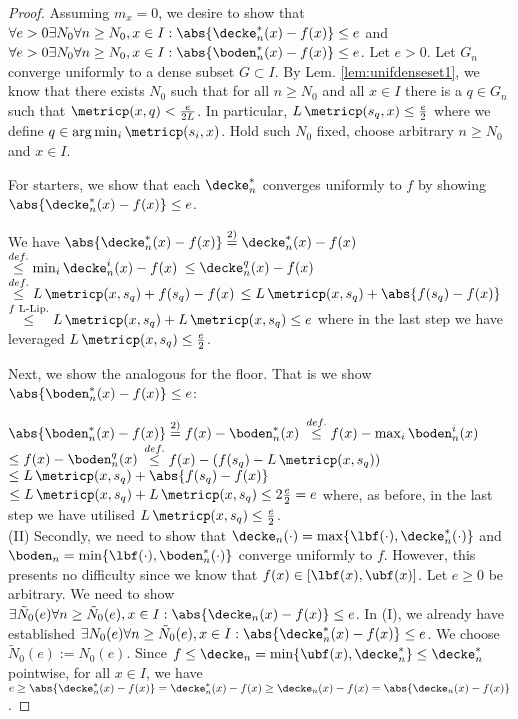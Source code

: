 \begin{thm}
\begin{proof}
Assuming $m_x =0$, we desire to show that $\forall e >0 \exists N_0 \forall n \geq N_0 , x \in I : \abs{ \decke^*_n(x) - f(x)} \leq e $ and $\forall e >0 \exists N_0 \forall n \geq N_0 , x \in I : \abs{ \boden^*_n(x) - f(x)} \leq e $.
Let $e > 0$.
Let $G_n$ converge uniformly to a dense subset  $G \subset I$. By Lem. \ref{lem:unifdenseset1}, we know that 
there exists $N_0$ such that for all $n \geq N_0$ and all $x \in I$ there is a $q \in G_n$ such that $\metricp(x,q) < \frac{e}{2  L}$. 
In particular, $ L \, \metricp(s_q ,x ) \leq \frac{e}{2}$ where we define $q \in \arg\min_{i} \metricp(s_i ,x )$. 
Hold such $N_0$ fixed, choose arbitrary $n \geq N_0$ and $x \in I$. 

For starters, we show that each $\decke^*_n$ converges uniformly to $ f$ by showing $\abs{\decke^*_n(x) - f(x) } \leq e$.

We have
$\abs{\decke^*_n(x) - f(x)} \stackrel{2)}{=} \decke^*_n(x) - f(x) $  
$\stackrel{def.}{\leq}\min_{i} \decke^i_n(x) - f(x) $
$\leq   \decke^q_n(x) - f(x) $
$\stackrel{def.}{\leq}  L \, \metricp(x,s_q)+f(s_q) - f(x) $
$\leq  L \, \metricp(x,s_q)+ \abs{f(s_q) - f(x) }$
$\stackrel{f \text{ L-Lip.}}{\leq}  L \, \metricp(x,s_q)+   L \, \metricp(x,s_q) \leq  e$ where in the last step we have leveraged $L \, \metricp(x,s_q) \leq \frac{e}{2}$.

Next, we show the analogous for the floor. 
That is we show  $\abs{\boden^*_n(x) - f(x) }\leq e$:

$\abs{  \boden^*_n(x) - f(x)}\stackrel{2)}{=} f(x) - \boden^*_n(x) $  
$\stackrel{def.}{\leq} f(x) - \max_{i} \boden^i_n(x) $
$\leq   f(x)- \boden^q_n(x)  $
$\stackrel{def.}{\leq} f(x) - (f(s_q) -  L \, \metricp(x,s_q))  $
$\leq  L \, \metricp(x,s_q)+ \abs{f(s_q) - f(x) }$
$\leq  L \, \metricp(x,s_q)+   L\, \metricp(x,s_q) \leq 2 \frac{e}{2}= e$ where, as before, in the last step we have utilised $ L \, \metricp(x,s_q) \leq \frac{e}{2}$.\\

(II) Secondly, we need to show that $\decke_n (\cdot)= \max\{\lbf(\cdot), \decke^*_n(\cdot)\}$ and $\boden_n = \min\{\lbf(\cdot), \boden^*_n(\cdot)\}$ converge uniformly to $f$. However, this presents no difficulty since we know that $f(x) \in [\lbf(x) ,\ubf(x)]$. Let $e\geq0$ be arbitrary. We need to show $\exists \tilde N_0(e) \forall n \geq \tilde N_0(e) , x \in I : \abs{ \decke_n(x) - f(x)} \leq e $. In (I), we already have established $\exists  N_0(e) \forall n \geq \tilde N_0(e) , x \in I : \abs{ \decke^*_n(x) - f(x)} \leq e $. We choose $\tilde N_0(e) := N_0(e)$. Since $f \leq \decke_n = \min\{ \ubf(x), \decke^*_n\} \leq \decke^*_n$ pointwise, for all $x \in I$, we have 
$e \geq \abs{\decke^*_n(x) - f(x) } =  \decke^*_n(x) - f(x) \geq \decke_n(x) - f(x)  = \abs{\decke_n(x) - f(x)} $. 


\end{proof}
\end{thm}
